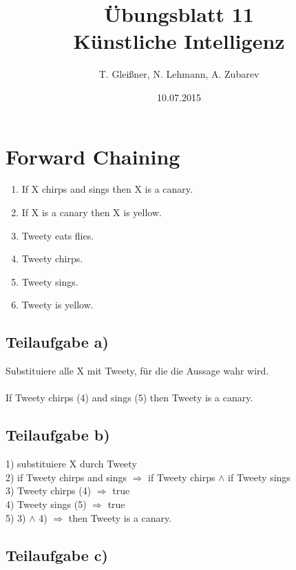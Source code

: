 \documentclass[12pt]{article}
\title{\"Ubungsblatt 11\\ \glqq K\"unstliche Intelligenz\grqq}
\author{T. Glei\ss ner, N. Lehmann, A. Zubarev}
\date{10.07.2015}
\begin{document}
\maketitle
\tableofcontents
\newpage

\section{Forward Chaining}

\begin{enumerate}
\item If X chirps and sings then X is a canary.
\item If X is a canary then X is yellow.
\item Tweety eats flies.
\item Tweety chirps.
\item Tweety sings.
\item Tweety is yellow.
\end{enumerate}

\subsection{Teilaufgabe a)}

Substituiere alle X mit Tweety, für die die Aussage wahr wird.\\
\\
If Tweety chirps (4) and sings (5) then Tweety is a canary.

\subsection{Teilaufgabe b)}

1) substituiere X durch Tweety\\
2) if Tweety chirps and sings $\Rightarrow$ if Tweety chirps $\wedge$ if Tweety sings\\
3) Tweety chirps (4) $\Rightarrow$ true\\
4) Tweety sings  (5) $\Rightarrow$ true\\
5) 3) $\wedge$ 4) $\Rightarrow$ then Tweety is a canary.

\newpage

\subsection{Teilaufgabe c)}
\end{document}
